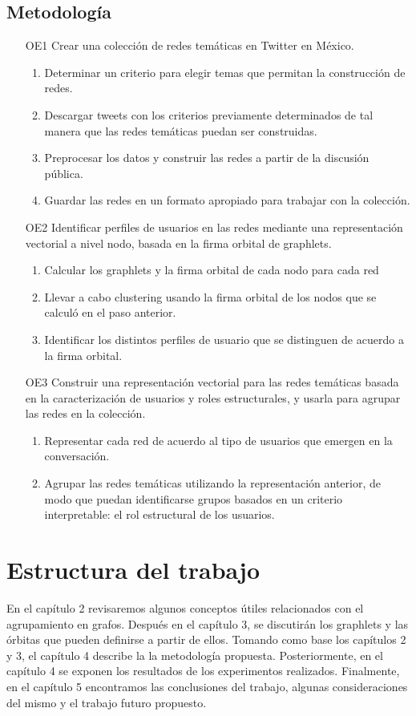 \subsection{Metodología}
\label{sec:intro:organización}
\begin{enumerate}
    \item[OE1] Crear una colección de redes temáticas en Twitter en México.
    \begin{enumerate}
        \item Determinar un criterio para elegir temas que permitan la construcción de redes.
        \item Descargar tweets con los criterios previamente determinados de tal manera que las redes temáticas puedan ser construidas.
        \item Preprocesar los datos y construir las redes a partir de la discusión pública.
        \item Guardar las redes en un formato apropiado para trabajar con la colección.
    \end{enumerate}
    \item[OE2] Identificar perfiles de usuarios en las redes mediante una representación vectorial a nivel nodo, basada en la firma orbital de graphlets. 
    \begin{enumerate}
        \item Calcular los graphlets y la firma orbital de cada nodo para cada red
         \item Llevar a cabo clustering usando la firma orbital de los nodos que se calculó en el paso anterior.
        \item Identificar los distintos perfiles de usuario que se distinguen de acuerdo a la firma orbital.
    \end{enumerate}
    \item[OE3] Construir una representación vectorial para las redes temáticas basada en la caracterización de usuarios y roles estructurales, y usarla para agrupar las redes en la colección.
    \begin{enumerate}
        \item Representar cada red de acuerdo al tipo de usuarios que emergen en la conversación. 
        \item Agrupar las redes temáticas utilizando la representación anterior, de modo que puedan identificarse grupos basados en un criterio interpretable: el rol estructural de los usuarios. 
    \end{enumerate}
\end{enumerate}


\section{Estructura del trabajo}
En el capítulo 2 revisaremos algunos conceptos útiles relacionados con el agrupamiento en grafos. Después en el capítulo 3, se discutirán los graphlets y las órbitas que pueden definirse a partir de ellos. Tomando como base los capítulos 2 y 3, el capítulo 4 describe la la metodología propuesta. Posteriormente, en el capítulo 4 se exponen los resultados de los experimentos realizados. Finalmente, en el capítulo 5 encontramos las conclusiones del trabajo, algunas consideraciones del mismo y el trabajo futuro propuesto.